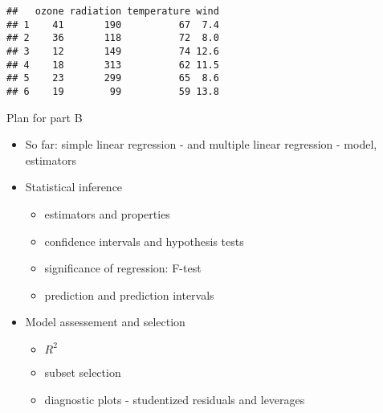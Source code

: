 \documentclass[ignorenonframetext,]{beamer}
\providecommand{\tightlist}{%
  \setlength{\itemsep}{0pt}\setlength{\parskip}{0pt}}
\begin{document}
\begin{frame}[fragile]

\begin{verbatim}
##   ozone radiation temperature wind
## 1    41       190          67  7.4
## 2    36       118          72  8.0
## 3    12       149          74 12.6
## 4    18       313          62 11.5
## 5    23       299          65  8.6
## 6    19        99          59 13.8
\end{verbatim}

\end{frame}

\begin{frame}

\begin{block}{Plan for part B}

\begin{itemize}
\tightlist
\item
  So far: simple linear regression - and multiple linear regression -
  model, estimators
\item
  Statistical inference

  \begin{itemize}
  \tightlist
  \item
    estimators and properties
  \item
    confidence intervals and hypothesis tests
  \item
    significance of regression: F-test
  \item
    prediction and prediction intervals
  \end{itemize}
\item
  Model assessement and selection

  \begin{itemize}
  \tightlist
  \item
    \(R^2\)
  \item
    subset selection
  \item
    diagnostic plots - studentized residuals and leverages
  \end{itemize}
\end{itemize}

\end{block}

\end{frame}
\end{document}
